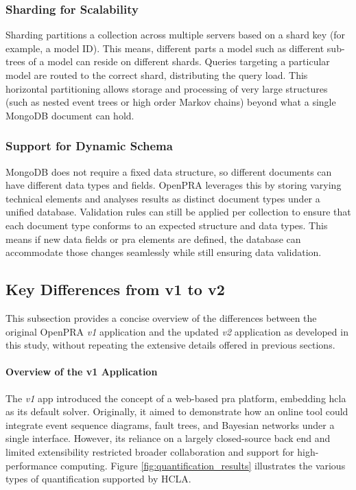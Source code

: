 \subsubsection{Sharding for Scalability}

Sharding partitions a collection across multiple servers based on a shard key (for example, a model ID). This means, different parts a model such as different sub-trees of a model can reside on different shards. Queries targeting a particular model are routed to the correct shard, distributing the query load. This horizontal partitioning allows storage and processing of very large structures (such as nested event trees or high order Markov chains) beyond what a single MongoDB document can hold.

\subsubsection{Support for Dynamic Schema}

MongoDB does not require a fixed data structure, so different documents can have different data types and fields. OpenPRA leverages this by storing varying technical elements and analyses results as distinct document types under a unified database. Validation rules can still be applied per collection to ensure that each document type conforms to an expected structure and data types. This means if new data fields or \acrshort{pra} elements are defined, the database can accommodate those changes seamlessly while still ensuring data validation.

\subsection{Key Differences from v1 to v2}
\label{sec:distinguish-v1-v2}
This subsection provides a concise overview of the differences between the original OpenPRA \textit{v1} application and the updated \textit{v2} application as developed in this study, without repeating the extensive details offered in previous sections.

\paragraph{Overview of the v1 Application}
The \textit{v1} app introduced the concept of a web-based \acrshort{pra} platform, embedding \acrshort{hcla} as its default solver. Originally, it aimed to demonstrate how an online tool could integrate event sequence diagrams, fault trees, and Bayesian networks under a single interface. However, its reliance on a largely closed-source back end and limited extensibility restricted broader collaboration and support for high-performance computing. Figure \ref{fig:quantification_results} illustrates the various types of quantification supported by HCLA.

